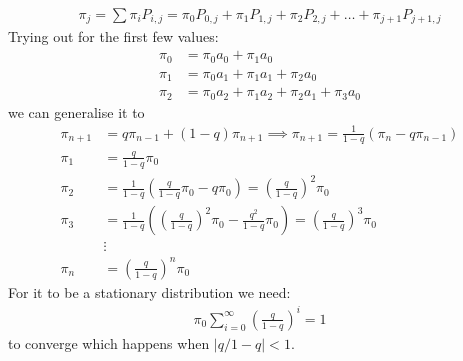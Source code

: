 \documentclass[a4paper,10pt]{article}
\theoremstyle{definition}
\begin{document}
\begin{enumerate}
\begin{enumerate}[(a)]
\begin{align*}
\pi_j=\sum\pi_iP_{i,j}=\pi_0P_{0,j}+\pi_1P_{1,j}+\pi_2P_{2,j}+\ldots+\pi_{j+1}P_{j+1,j}
\end{align*}
Trying out for the first few values:
\begin{align*}
\pi_0 &=  \pi_0a_{0}+\pi_1a_{0}\\
\pi_1 &= \pi_0a_1 +\pi_1a_1  +\pi_2a_0 \\
\pi_2 &= \pi_0a_2 + \pi_1a_2 + \pi_2a_1+ \pi_3a_0
\end{align*}
we can generalise it to 
\begin{align*}
\pi_{n+1}&=q\pi_{n-1}+(1-q)\pi_{n+1}\implies \pi_{n+1}=\frac{1}{1-q}(\pi_n-q\pi_{n-1})\\
\pi_1&=\frac{q}{1-q}\pi_0\\
\pi_2&=\frac{1}{1-q}\left(\frac{q}{1-q}\pi_0-q\pi_0\right)=\left(\frac{q}{1-q}\right)^2\pi_0\\
\pi_3&=\frac{1}{1-q}\left(\left(\frac{q}{1-q}\right)^2\pi_0-\frac{q^2}{1-q}\pi_0\right)=\left(\frac{q}{1-q}\right)^3\pi_0\\
&\vdots\\
\pi_n&=\left(\frac{q}{1-q}\right)^n\pi_0
\end{align*}
For it to be a stationary distribution we need:
\begin{align*}
\pi_0\sum_{i=0}^{\infty}\left(\frac{q}{1-q}\right)^i=1
\end{align*}
to converge which happens when $|q/1-q|<1$.
\end{enumerate}
\end{enumerate}
\end{document}
